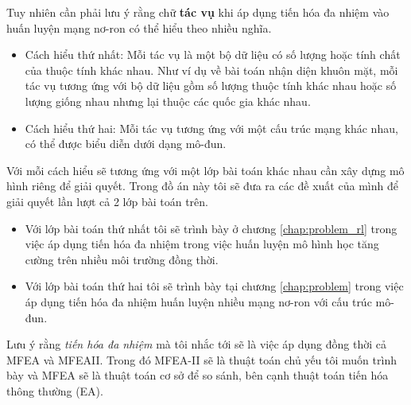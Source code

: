     Tuy nhiên cần phải lưu ý rằng chữ \textbf{tác vụ} khi áp dụng tiến hóa đa nhiệm vào huấn luyện mạng nơ-ron có thể hiểu theo nhiều nghĩa.
    \begin{itemize}
        \item Cách hiểu thứ nhất: Mỗi tác vụ là một bộ dữ liệu có số lượng hoặc tính chất của thuộc tính khác nhau. Như ví dụ về bài toán nhận diện khuôn mặt, mỗi tác vụ tương ứng với bộ dữ liệu gồm số lượng thuộc tính khác nhau hoặc số lượng giống nhau nhưng lại thuộc các quốc gia khác nhau. 
        \item Cách hiểu thứ hai: Mỗi tác vụ tương ứng với một cấu trúc mạng khác nhau, có thể được biểu diễn dưới dạng mô-đun. 
    \end{itemize}
    Với mỗi cách hiểu sẽ tương ứng với một lớp bài toán khác nhau cần xây dựng mô hình riêng để giải quyết. Trong đồ án này tôi sẽ đưa ra các đề xuất của mình để giải quyết lần lượt cả 2 lớp bài toán trên.
    \begin{itemize}
        \item Với lớp bài toán thứ nhất tôi sẽ trình bày ở chương \ref{chap:problem_rl} trong việc áp dụng tiến hóa đa nhiệm trong việc huấn luyện mô hình học tăng cường trên nhiều môi trường đồng thời.
        \item Với lớp bài toán thứ hai tôi sẽ trình bày tại chương \ref{chap:problem} trong việc áp dụng tiến hóa đa nhiệm huấn luyện nhiều mạng nơ-ron với cấu trúc mô-đun.
    \end{itemize}
    Lưu ý rằng \emph{tiến hóa đa nhiệm} mà tôi nhắc tới sẽ là việc áp dụng đồng thời cả MFEA và MFEAII. Trong đó MFEA-II sẽ là thuật toán chủ yếu tôi muốn trình bày và MFEA sẽ là thuật toán cơ sở để so sánh, bên cạnh thuật toán tiến hóa thông thường (EA).
    

